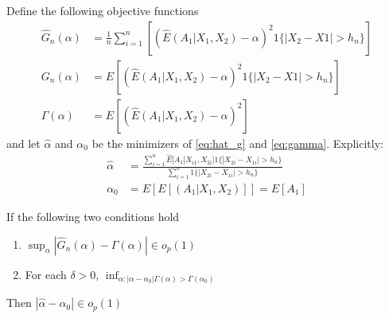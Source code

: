 \begin{definition} Define the following objective functions
  \begin{align}
    \hat{G}_{n}(\alpha) &= \frac{1}{n} \sum_{i=1}^{n} \left [\left( \hat{E}(A_1|X_1, X_2) - \alpha \right)^2 1\{ | X_2 - X1 | > h_n \} \right] \label{eq:hat_g} \\ 
    G_{n}(\alpha) &= E\left [\left( \hat{E}(A_1|X_1, X_2) - \alpha \right)^2 1\{ | X_2 - X1 | > h_n \} \right]  \\ 
    \Gamma(\alpha) &= E\left [\left( \hat{E}(A_1|X_1, X_2) - \alpha \right)^2 \right]  \label{eq:gamma}
  \end{align}
  and let $\hat{\alpha}$ and $\alpha_{0}$ be the minimizers of \ref{eq:hat_g} and \ref{eq:gamma}. Explicitly:
  \begin{align}
    \hat{\alpha} &= \frac{ \sum_{i=1}^{n} \hat{E}[A_{1} | X_{i1}, X_{2i}] 1\{| X_{2i} - X_{1i}| > h_{n}\}  } { \sum_{i=1}^{n} 1\{ |X_{2i} - X_{1i}| > h_{n} \} } \\
    \alpha_{0} &= E[E[(A_1 | X_{1}, X_{2})]] = E[A_{1}]
  \end{align}
\end{definition}



\begin{theorem}[Consistency] If the following two conditions hold 
  \begin{enumerate}
    \item $\sup_{\alpha} \left| \hat{G}_{n}(\alpha) - \Gamma(\alpha) \right| \in o_{p}(1)$
      \item For each $\delta > 0$, $\inf_{\alpha: |\alpha - \alpha_{0}| \Gamma(\alpha) > \Gamma(\alpha_0)}$ 
  \end{enumerate}
  Then $|\hat{\alpha} - \alpha_{0}| \in o_{p}(1)$
\end{theorem}


